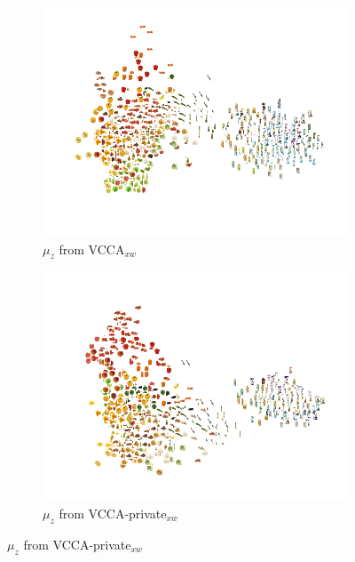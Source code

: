 
\begin{figure}[!tp]
     \centering
     \begin{subfigure}[b]{0.49\textwidth}
         \centering
         \includegraphics[width=\textwidth]{figures_and_tables/latent_space_visualizations/pca_latents_vcca_xw_seed2.png}
         \caption{$\mu_{z}$ from VCCA$_{x w}$}
         \label{fig:pca_vcca_xw_z}
     \end{subfigure} 
     \begin{subfigure}[b]{0.49\textwidth}
         \centering
         \includegraphics[width=\textwidth]{figures_and_tables/private_latent_space_visualizations/pca_z_vaecca_private_xw_seed1.png}
         \caption{$\mu_{z}$ from VCCA-private$_{x w}$}

\end{subfigure}
\end{figure}
